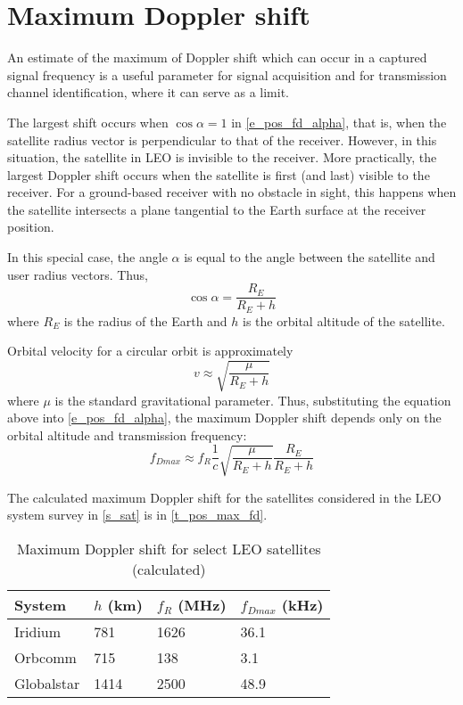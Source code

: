 \section{Maximum Doppler shift}
An estimate of the maximum of Doppler shift which can occur in a captured signal frequency is a useful parameter for signal acquisition and for transmission channel identification, where it can serve as a limit.

The largest shift occurs when $\cos{\alpha} = 1$ in \autoref{e_pos_fd_alpha}, that is, when the satellite radius vector is perpendicular to that of the receiver. However, in this situation, the satellite in LEO is invisible to the receiver. More practically, the largest Doppler shift occurs when the satellite is first (and last) visible to the receiver. For a ground-based receiver with no obstacle in sight, this happens when the satellite intersects a plane tangential to the Earth surface at the receiver position.

In this special case, the angle $\alpha$ is equal to the angle between the satellite and user radius vectors. Thus,
\begin{equation*}
    \cos{\alpha} = \frac{R_E}{R_E + h}
\end{equation*}
where $R_E$ is the radius of the Earth and $h$ is the orbital altitude of the satellite.

Orbital velocity for a circular orbit is approximately
\begin{equation*}
    v \approx \sqrt{\frac{\mu}{R_E + h}}
\end{equation*}
where $\mu$ is the standard gravitational parameter. Thus, substituting the equation above into \autoref{e_pos_fd_alpha}, the maximum Doppler shift depends only on the orbital altitude and transmission frequency:
\begin{equation}
    \label{e_pos_fd_max}
    f_{D max} \approx f_R \frac{1}{c} \sqrt{\frac{\mu}{R_E + h}} \frac{R_E}{R_E + h}
\end{equation}

The calculated maximum Doppler shift for the satellites considered in the LEO system survey in \autoref{s_sat} is in \autoref{t_pos_max_fd}.

\begin{table}
    \centering
    \begin{tabular}{llll}
    System     & $h$ (km) &  $f_R$ (MHz) & $f_{Dmax}$ (kHz) \\ \hline
    Iridium    &  781  &  1626 & \num{36.1} \\
    Orbcomm    &  715  &  138  & \num{3.1} \\
    Globalstar &  1414 &  2500 & \num{48.9}
    \end{tabular}
    \caption{Maximum Doppler shift for select LEO satellites (calculated)}
    \label{t_pos_max_fd}
\end{table}



